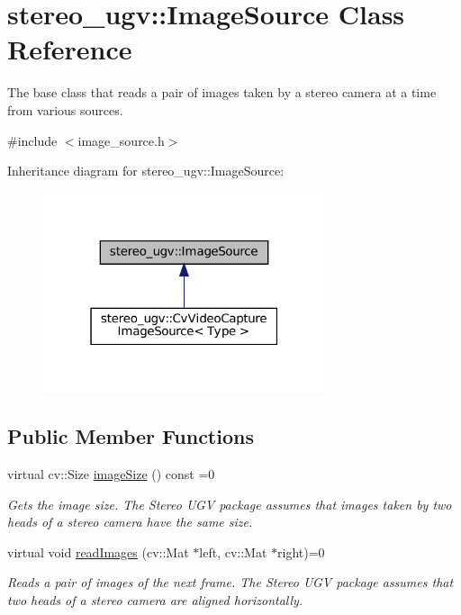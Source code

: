 \hypertarget{classstereo__ugv_1_1ImageSource}{}\section{stereo\+\_\+ugv\+:\+:Image\+Source Class Reference}
\label{classstereo__ugv_1_1ImageSource}


The base class that reads a pair of images taken by a stereo camera at a time from various sources.  




{\ttfamily \#include $<$image\+\_\+source.\+h$>$}



Inheritance diagram for stereo\+\_\+ugv\+:\+:Image\+Source\+:\nopagebreak
\begin{figure}[H]
\begin{center}
\leavevmode
\includegraphics[width=235pt]{classstereo__ugv_1_1ImageSource__inherit__graph}
\end{center}
\end{figure}
\subsection*{Public Member Functions}
\begin{DoxyCompactItemize}
\item 
virtual cv\+::\+Size \hyperlink{classstereo__ugv_1_1ImageSource_a30d9146abcdcef11f03685a9887b96d0}{image\+Size} () const =0
\begin{DoxyCompactList}\small\item\em Gets the image size. The Stereo U\+GV package assumes that images taken by two heads of a stereo camera have the same size. \end{DoxyCompactList}\item 
virtual void \hyperlink{classstereo__ugv_1_1ImageSource_a3d87f7b09cd8889fcbee3efb29a0c39c}{read\+Images} (cv\+::\+Mat $\ast$left, cv\+::\+Mat $\ast$right)=0
\begin{DoxyCompactList}\small\item\em Reads a pair of images of the next frame. The Stereo U\+GV package assumes that two heads of a stereo camera are aligned horizontally. \end{DoxyCompactList}\end{DoxyCompactItemize}
